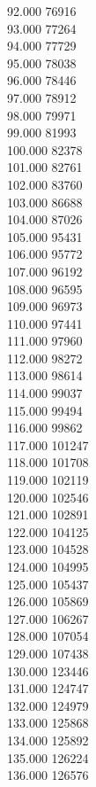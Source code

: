 { 92.000	76916 \\
 93.000	77264 \\
 94.000	77729 \\
 95.000	78038 \\
 96.000	78446 \\
 97.000	78912 \\
 98.000	79971 \\
 99.000	81993 \\
 100.000	82378 \\
 101.000	82761 \\
 102.000	83760 \\
 103.000	86688 \\
 104.000	87026 \\
 105.000	95431 \\
 106.000	95772 \\
 107.000	96192 \\
 108.000	96595 \\
 109.000	96973 \\
 110.000	97441 \\
 111.000	97960 \\
 112.000	98272 \\
 113.000	98614 \\
 114.000	99037 \\
 115.000	99494 \\
 116.000	99862 \\
 117.000	101247 \\
 118.000	101708 \\
 119.000	102119 \\
 120.000	102546 \\
 121.000	102891 \\
 122.000	104125 \\
 123.000	104528 \\
 124.000	104995 \\
 125.000	105437 \\
 126.000	105869 \\
 127.000	106267 \\
 128.000	107054 \\
 129.000	107438 \\
 130.000	123446 \\
 131.000	124747 \\
 132.000	124979 \\
 133.000	125868 \\
 134.000	125892 \\
 135.000	126224 \\
 136.000	126576 \\
}
